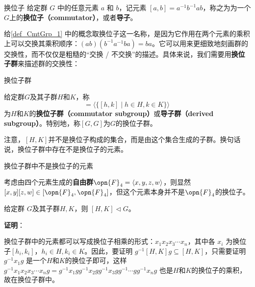 


\begin{definition}{换位子}\label{def_CmtGrp_1}
给定群 $G$ 中的任意元素 $a$ 和 $b$，记元素 $[a, b]=a^{-1}b^{-1}ab$，称之为为一个$G$上的\textbf{换位子（commutator）}，或者\textbf{导子}。
\end{definition}

给\autoref{def_CmtGrp_1} 中的概念取换位子这一名称，是因为它作用在两个元素的乘积上可以交换其乘积顺序：$(ab)(b^{-1}a^{-1}ba)=ba$。它可以用来更细致地刻画群的交换性，而不仅仅是粗糙的“交换 / 不交换”的描述。具体来说，我们需要用\textbf{换位子群}来描述群的交换性：

\begin{definition}{换位子群}

给定群$G$及其子群$H$和$K$，称
\begin{equation}
[H, K] = \langle \{[h, k]\mid h\in H, k\in K\} \rangle~
\end{equation}
为$H$和$K$的\textbf{换位子群（commutator subgroup）}或\textbf{导子群（derived subgroup）}。特别地，称$[G, G]$为$G$的换位子群。

\end{definition}

注意，$[H, K]$并不是换位子构成的集合，而是由这个集合生成的子群。换句话说，换位子群中存在不是换位子的元素。

\begin{example}{换位子群中不是换位子的元素}

考虑由四个元素生成的\textbf{自由群}$\opn{F}_4=\langle x, y, z, w \rangle$，则显然$[x, y][z, w]\in [\opn{F}_4, \opn{F}_4]$，但这个元素本身并不是$\opn{F}_4$的换位子。

\end{example}

\begin{theorem}{}\label{the_CmtGrp_2}
给定群 $G$及其子群$H, K$，则 $[H, K]\triangleleft G$。
\end{theorem}

\textbf{证明}：

换位子群中的元素都可以写成换位子相乘的形式：$x_1x_2x_3\cdots x_n$，其中各 $x_i$ 为换位子$[h_i, k_i]$，$h_i\in H, k_i\in K$。因此，要证明 $g^{-1}[H, K]g\subseteq [H, K]$，只需要证明 $g^{-1}x_1g$ 是一个$H$和$K$的换位子即可，这样 $g^{-1}x_1x_2x_3\cdots x_ng=g^{-1}x_1gg^{-1}x_2gg^{-1}x_3gg^{-1}\cdots gg^{-1}x_ng$ 也是$H$和$K$的换位子的乘积，故在换位子群中。

